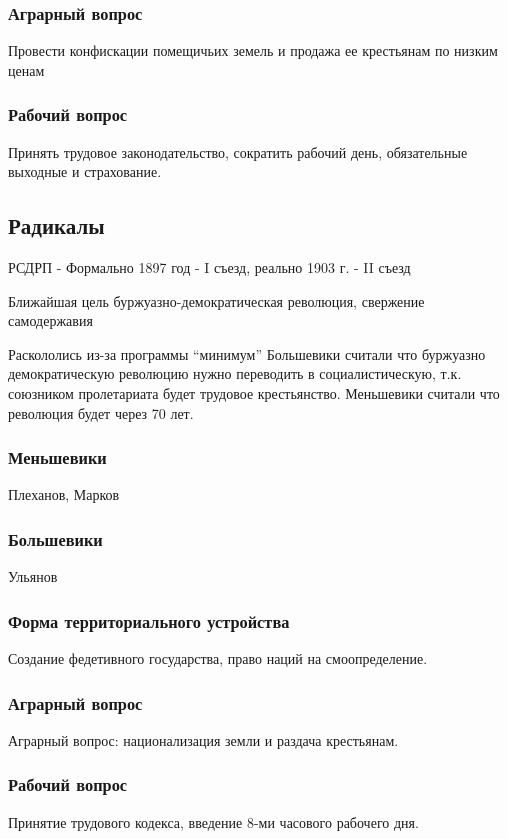 \documentclass[a4paper]{article}
\begin{document}
\subsubsection{Аграрный вопрос}
Провести конфискации помещичьих земель и продажа ее крестьянам по низким ценам

\subsubsection{Рабочий вопрос}
Принять трудовое законодательство, сократить рабочий день, обязательные выходные и страхование.

\subsection{Радикалы}
РСДРП - Формально 1897 год - I съезд, реально 1903 г. - II съезд

Ближайшая цель буржуазно-демократическая революция, свержение самодержавия

Раскололись из-за программы ``минимум''
Большевики считали что буржуазно демократическую революцию нужно переводить в социалистическую, т.к. союзником пролетариата будет трудовое крестьянство.
Меньшевики считали что революция будет через 70 лет.

\subsubsection{Меньшевики}
Плеханов, Марков

\subsubsection{Большевики}
Ульянов

\subsubsection{Форма территориального устройства}
Создание федетивного государства, право наций на смоопределение.

\subsubsection{Аграрный вопрос}
Аграрный вопрос: национализация земли и раздача крестьянам.

\subsubsection{Рабочий вопрос}
Принятие трудового кодекса, введение 8-ми часового рабочего дня.
\end{document}
